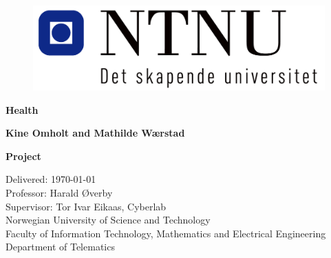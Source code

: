 \documentclass[b5paper,twoside,openright,11pt]{report}
\begin{document}
\begin{flushleft}
\begin{figure}[htb]
\includegraphics[scale=0.6]{NTNU-logo}
\end{figure}
\bigskip
\bigskip
\bigskip
\bigskip
\begin{huge}
\textbf{Health}\\
\end{huge} 
\bigskip
\bigskip
\bigskip
\bigskip
\bigskip
\bigskip
\bigskip
\begin{Large}
\textbf{Kine Omholt and Mathilde Wærstad}
\end{Large}
\bigskip
\bigskip
\bigskip
\bigskip
\bigskip
\bigskip
\begin{large}
\textbf{Project\\}
\end{large}
Delivered: \today\\
Professor: Harald Øverby\\
Supervisor: Tor Ivar Eikaas, Cyberlab\\
\bigskip
\bigskip
\bigskip
\bigskip
\bigskip
Norwegian University of Science and Technology\\ 
Faculty of Information Technology, Mathematics and Electrical Engineering\\
Department of Telematics
\end{flushleft}
\cleardoublepage
\end{document}
